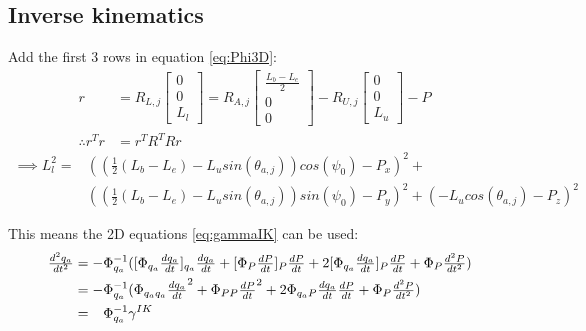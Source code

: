 \subsection{Inverse kinematics}
Add the first 3 rows in equation \ref{eq:Phi3D}:
\begin{equation}
    \begin{aligned}
    r&= R_{L,j}\begin{bmatrix}0\\0\\L_l \end{bmatrix} = R_{A,j}\begin{bmatrix}\frac{L_b-L_e}{2}\\0\\0 \end{bmatrix} - R_{U,j}\begin{bmatrix}0\\0\\L_u  \end{bmatrix} - P  \\
\therefore    r^Tr&=r^TR^TRr &
    \end{aligned}
\end{equation}
\begin{equation}
\begin{split}
\implies L_l^2 =&\left(\left(\tfrac{1}{2}(L_b-L_e)-L_u sin(\theta_{a,j})\right)cos(\psi_0) -P_x\right)^2+ \\       &\left(\left(\tfrac{1}{2}(L_b-L_e)-L_usin(\theta_{a,j})\right)sin(\psi_0)-P_y\right)^2+(-L_ucos(\theta_{a,j})-P_z)^2
\end{split}
\end{equation}

This means the 2D equations \ref{eq:gammaIK} can be used:
\begin{equation}
\begin{aligned}
\tfrac{d^2q_a}{dt^2}&=-\Phi_{q_a}^{-1}([\Phi_{q_a}\tfrac{dq_a}{dt}]_{q_a}\tfrac{dq_a}{dt}+[\Phi_{P}\tfrac{dP}{dt}]_{P}\tfrac{dP}{dt}+2[\Phi_{q_a}\tfrac{dq_a}{dt}]_{P}\tfrac{dP}{dt}+\Phi_P\tfrac{d^2P}{dt^2})\\
&=-\Phi_{q_a}^{-1} (\Phi_{q_aq_a}\tfrac{dq_a}{dt}^2+\Phi_{PP}\tfrac{dP}{dt}^2+2\Phi_{q_aP}\tfrac{dq_a}{dt}\tfrac{dP}{dt}+\Phi_P\tfrac{d^2P}{dt^2}) \\
&=\hphantom{-}\Phi_{q_a}^{-1}\gamma^{IK}
\end{aligned}
\end{equation}

